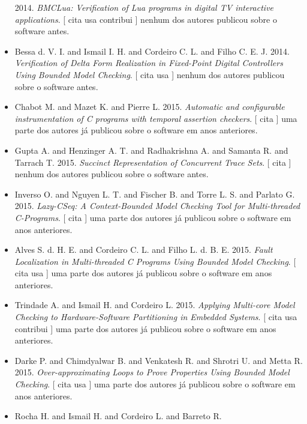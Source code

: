 \begin{itemize}
      2014.
        \textit{ BMCLua: Verification of Lua programs in digital TV interactive applications}.
      [
          cita
          usa
          contribui
      ]
nenhum dos autores publicou sobre o software antes.
\item Bessa d. V. I. and Ismail I. H. and Cordeiro C. L. and Filho C. E. J.
      2014.
        \textit{ Verification of Delta Form Realization in Fixed-Point Digital Controllers Using Bounded Model Checking}.
      [
          cita
          usa
      ]
nenhum dos autores publicou sobre o software antes.
\item Chabot M. and Mazet K. and Pierre L.
      2015.
        \textit{ Automatic and configurable instrumentation of C programs with temporal assertion checkers}.
      [
          cita
      ]
uma parte dos autores já publicou sobre o software em anos anteriores.
\item Gupta A. and Henzinger A. T. and Radhakrishna A. and Samanta R. and Tarrach T.
      2015.
        \textit{ Succinct Representation of Concurrent Trace Sets}.
      [
          cita
      ]
nenhum dos autores publicou sobre o software antes.
\item Inverso O. and Nguyen L. T. and Fischer B. and Torre L. S. and Parlato G.
      2015.
        \textit{ Lazy-CSeq: A Context-Bounded Model Checking Tool for Multi-threaded C-Programs}.
      [
          cita
      ]
uma parte dos autores já publicou sobre o software em anos anteriores.
\item Alves S. d. H. E. and Cordeiro C. L. and Filho L. d. B. E.
      2015.
        \textit{ Fault Localization in Multi-threaded C Programs Using Bounded Model Checking}.
      [
          cita
          usa
      ]
uma parte dos autores já publicou sobre o software em anos anteriores.
\item Trindade A. and Ismail H. and Cordeiro L.
      2015.
        \textit{ Applying Multi-core Model Checking to Hardware-Software Partitioning in Embedded Systems}.
      [
          cita
          usa
          contribui
      ]
uma parte dos autores já publicou sobre o software em anos anteriores.
\item Darke P. and Chimdyalwar B. and Venkatesh R. and Shrotri U. and Metta R.
      2015.
        \textit{ Over-approximating Loops to Prove Properties Using Bounded Model Checking}.
      [
          cita
          usa
      ]
uma parte dos autores já publicou sobre o software em anos anteriores.
\item Rocha H. and Ismail H. and Cordeiro L. and Barreto R.

\end{itemize}
